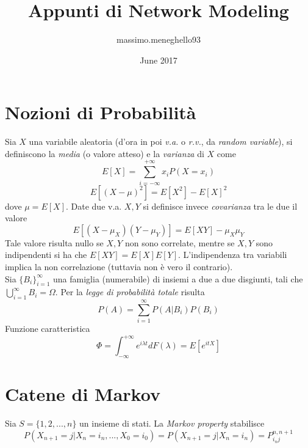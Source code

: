 \documentclass{article}
\title{Appunti di Network Modeling}
\author{massimo.meneghello93}
\date{June 2017}
\begin{document}
\maketitle


\section{Nozioni di Probabilità}
Sia $X$ una variabile aleatoria (d'ora in poi \textit{v.a.} o \textit{r.v.}, da \textit{random variable}), si definiscono la \textit{media} (o valore atteso) e la \textit{varianza} di $X$ come
\begin{equation}
    E[X] = \sum_{i = -\infty}^{+\infty} x_i P(X = x_i)
    \label{rv:mean}
\end{equation}
\begin{equation}
    E[(X-\mu)^2] = E[X^2] - E[X]^2
    \label{rv:varicance}
\end{equation}
dove $\mu = E[X]$. Date due v.a. $X, Y$ si definisce invece \textit{covarianza} tra le due il valore
\begin{equation}
    E[(X-\mu_X)(Y-\mu_Y)] = E[XY] - \mu_X\mu_Y
    \label{rv:covariance}
\end{equation}
Tale valore risulta nullo se $X, Y$ non sono correlate, mentre se $X, Y$ sono indipendenti si ha che $E[XY] = E[X]E[Y]$. L'indipendenza tra variabili implica la non correlazione (tuttavia non è vero il contrario).\\
Sia $\{B_i\}_{i=1}^{\infty}$ una famiglia (numerabile) di insiemi a due a due disgiunti, tali che $\bigcup_{i=1}^{\infty}B_i = \Omega$. Per la \textit{legge di probabilità totale} risulta
\begin{equation}
    P(A) = \sum_{i=1}^{\infty}P(A|B_i)P(B_i)
    \label{rv:total_prob}
\end{equation}
Funzione caratteristica
\begin{equation}
    \Phi = \int_{-\infty}^{+\infty} e^{i\lambda t} dF(\lambda) = E[e^{itX}]
\end{equation}


\section{Catene di Markov}

Sia $S = \{1,2,...,n\}$ un insieme di stati.
La \textit{Markov property} stabilisce
\begin{equation}
    P(X_{n+1} = j | X_n = i_n, ..., X_0 = i_0) = P(X_{n+1} = j | X_n = i_n) = P_{i_n j}^{n,n+1}
\end{equation}
\end{document}
